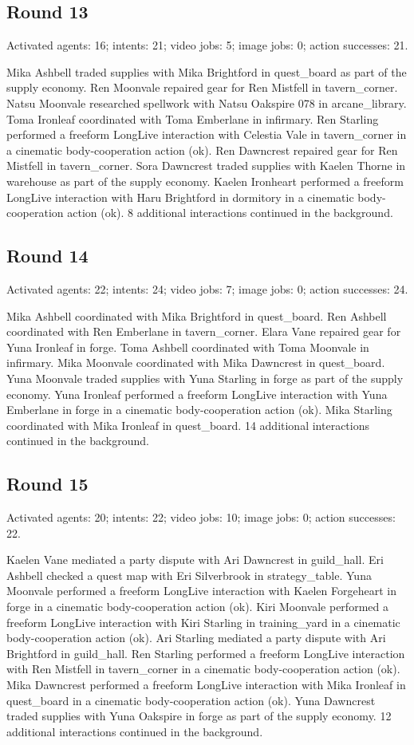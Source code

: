 \documentclass[11pt,a4paper]{article}
\begin{document}
\subsection{Round 13}
Activated agents: 16; intents: 21; video jobs: 5; image jobs: 0; action successes: 21.

Mika Ashbell traded supplies with Mika Brightford in quest\_board as part of the supply economy. Ren Moonvale repaired gear for Ren Mistfell in tavern\_corner. Natsu Moonvale researched spellwork with Natsu Oakspire 078 in arcane\_library. Toma Ironleaf coordinated with Toma Emberlane in infirmary. Ren Starling performed a freeform LongLive interaction with Celestia Vale in tavern\_corner in a cinematic body-cooperation action (ok). Ren Dawncrest repaired gear for Ren Mistfell in tavern\_corner. Sora Dawncrest traded supplies with Kaelen Thorne in warehouse as part of the supply economy. Kaelen Ironheart performed a freeform LongLive interaction with Haru Brightford in dormitory in a cinematic body-cooperation action (ok). 8 additional interactions continued in the background.

\subsection{Round 14}
Activated agents: 22; intents: 24; video jobs: 7; image jobs: 0; action successes: 24.

Mika Ashbell coordinated with Mika Brightford in quest\_board. Ren Ashbell coordinated with Ren Emberlane in tavern\_corner. Elara Vane repaired gear for Yuna Ironleaf in forge. Toma Ashbell coordinated with Toma Moonvale in infirmary. Mika Moonvale coordinated with Mika Dawncrest in quest\_board. Yuna Moonvale traded supplies with Yuna Starling in forge as part of the supply economy. Yuna Ironleaf performed a freeform LongLive interaction with Yuna Emberlane in forge in a cinematic body-cooperation action (ok). Mika Starling coordinated with Mika Ironleaf in quest\_board. 14 additional interactions continued in the background.

\subsection{Round 15}
Activated agents: 20; intents: 22; video jobs: 10; image jobs: 0; action successes: 22.

Kaelen Vane mediated a party dispute with Ari Dawncrest in guild\_hall. Eri Ashbell checked a quest map with Eri Silverbrook in strategy\_table. Yuna Moonvale performed a freeform LongLive interaction with Kaelen Forgeheart in forge in a cinematic body-cooperation action (ok). Kiri Moonvale performed a freeform LongLive interaction with Kiri Starling in training\_yard in a cinematic body-cooperation action (ok). Ari Starling mediated a party dispute with Ari Brightford in guild\_hall. Ren Starling performed a freeform LongLive interaction with Ren Mistfell in tavern\_corner in a cinematic body-cooperation action (ok). Mika Dawncrest performed a freeform LongLive interaction with Mika Ironleaf in quest\_board in a cinematic body-cooperation action (ok). Yuna Dawncrest traded supplies with Yuna Oakspire in forge as part of the supply economy. 12 additional interactions continued in the background.
\end{document}
